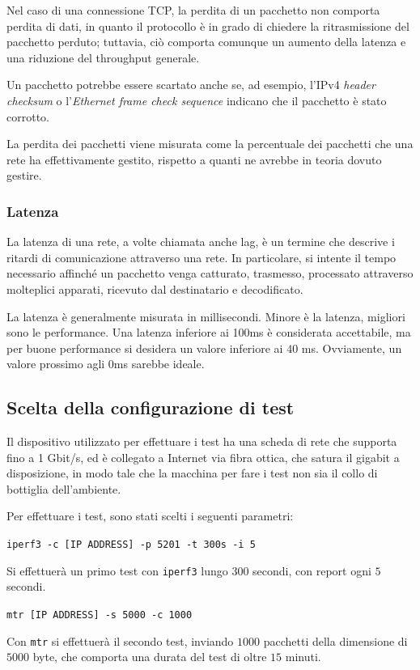 Nel caso di una connessione TCP, la perdita di un pacchetto non comporta perdita di dati, in quanto il protocollo è in grado di chiedere la ritrasmissione del pacchetto perduto; tuttavia, ciò comporta comunque un aumento della latenza e una riduzione del throughput generale.

Un pacchetto potrebbe essere scartato anche se, ad esempio, l'IPv4 \emph{header checksum} o l'\emph{Ethernet frame check sequence} indicano che il pacchetto è stato corrotto.

La perdita dei pacchetti viene misurata come la percentuale dei pacchetti che una rete ha effettivamente gestito, rispetto a quanti ne avrebbe in teoria dovuto gestire.


\subsubsection{Latenza}
La latenza di una rete, a volte chiamata anche lag, è un termine che descrive i ritardi di comunicazione attraverso una rete. In particolare, si intente il tempo necessario affinché un pacchetto venga catturato, trasmesso, processato attraverso molteplici apparati, ricevuto dal destinatario e decodificato.

La latenza è generalmente misurata in millisecondi. Minore è la latenza, migliori sono le performance. Una latenza inferiore ai 100ms è considerata accettabile, ma per buone performance si desidera un valore inferiore ai $40$ ms. Ovviamente, un valore prossimo agli 0ms sarebbe ideale.

\subsection{Scelta della configurazione di test}
Il dispositivo utilizzato per effettuare i test ha una scheda di rete che supporta fino a  1 Gbit/s, ed è collegato a Internet via fibra ottica, che satura il gigabit a disposizione, in modo tale che la macchina per fare i test non sia il collo di bottiglia dell'ambiente.


Per effettuare i test, sono stati scelti i seguenti parametri:


\texttt{iperf3 -c [IP ADDRESS] -p 5201 -t 300s -i 5}


Si effettuerà un primo test con \texttt{iperf3} lungo $300$ secondi, con report ogni $5$ secondi.

\texttt{mtr [IP ADDRESS] -s 5000 -c 1000}


Con \texttt{mtr} si effettuerà il secondo test, inviando $1000$ pacchetti della dimensione di $5000$ byte, che comporta una durata del test di oltre $15$ minuti.

